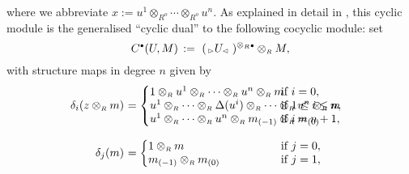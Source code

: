 \documentclass[reqno, a4paper, 10pt]{amsart}
\numberwithin{equation}{section}
\theoremstyle{plain}
\theoremstyle{definition}
\theoremstyle{remark}
\begin{document}
where we abbreviate $x:=u^1 \otimes_{{\scriptscriptstyle{{R^{o}}}}} \cdots \otimes_{{\scriptscriptstyle{{R^{o}}}}} u^n$. 
As explained in detail in \cite{KowKra:CSIACT}, this cyclic module is the generalised ``cyclic dual'' to the following cocyclic module:
set
$$
C^{{\scriptscriptstyle{\bullet}}}(U,M) \, := \,\, ({{}_{{{{\,\raise1pt\hbox{$\scriptscriptstyle{\rhd}$} \, }} \!}} {U}_{{\! {{\,\raise1pt\hbox{$\scriptscriptstyle{\lhd}$} \, }}}}\,})^{\otimes_{{\scriptscriptstyle{R}}}  {{\scriptscriptstyle{\bullet}}}} \otimes_{{\scriptscriptstyle{R}}} M,
$$
with structure maps in degree $n$ given by
\begin{equation}
\!\! \begin{array}{rll}
\label{anightinpyongyang}
{\delta}_i(z \otimes_{{\scriptscriptstyle{R}}} m) \!\!\!\!&= \left\{\!\!\!
\begin{array}{l} 1
\otimes_{{\scriptscriptstyle{R}}} u^1 \otimes_{{\scriptscriptstyle{R}}} \cdots
 \otimes_{{\scriptscriptstyle{R}}} u^n \otimes_{{\scriptscriptstyle{R}}} m  
\\ 
u^1 \otimes_{{\scriptscriptstyle{R}}} \cdots \otimes_{{\scriptscriptstyle{R}}} {\Delta} (u^i) \otimes_{{\scriptscriptstyle{R}}} \cdots
 \otimes_{{\scriptscriptstyle{R}}} u^n \otimes_{{\scriptscriptstyle{R}}} m
\\
u^1 \otimes_{{\scriptscriptstyle{R}}} \cdots \otimes_{{\scriptscriptstyle{R}}} u^n \otimes_{{\scriptscriptstyle{R}}} m_{(-1)} \otimes_{{\scriptscriptstyle{R}}} m_{(0)} 
\end{array}\right. \!\!\!\!\!\!\!\! 
& \!\! \hspace*{-2cm}  \begin{array}{l} \mbox{if} \ i=0, \\ \mbox{if} \
  1 \leq i \leq n, \\ \mbox{if} \ i = n + 1,  \end{array} \\
\\
{\delta}_j(m) \!\!\!\! &= \left\{ \!\!\!
\begin{array}{l}
		  1
		  \otimes_{{\scriptscriptstyle{R}}} m  \quad
\\
m_{(-1)} \otimes_{{\scriptscriptstyle{R}}} m_{(0)}  \quad 
\end{array}\right. & \!\! \hspace*{-2cm} 
\begin{array}{l} \mbox{if} \ j=0, \\ \mbox{if} \
  j = 1 ,  \end{array} \\

\end{array}
\end{equation}
\end{document}
